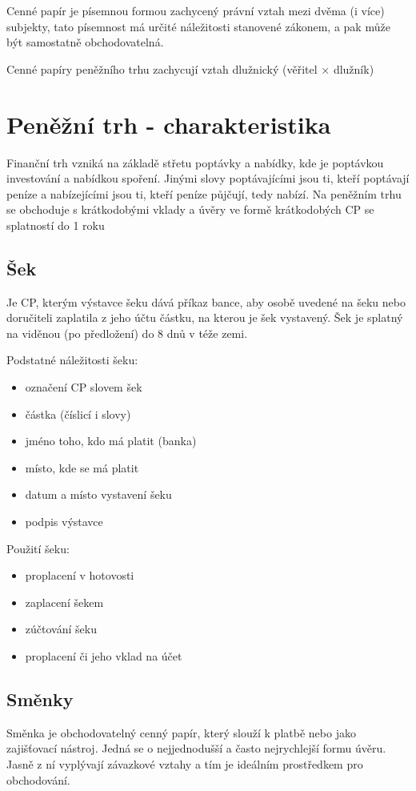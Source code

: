 Cenné papír je písemnou formou zachycený právní vztah mezi dvěma (i více) subjekty, tato písemnost má určité náležitosti stanovené zákonem, a pak může být samostatně obchodovatelná.

Cenné papíry peněžního trhu zachycují vztah dlužnický (věřitel $\times$ dlužník)

\section*{Peněžní trh - charakteristika}

Finanční trh vzniká na základě střetu poptávky a nabídky, kde je poptávkou investování a nabídkou spoření. Jinými slovy poptávajícími jsou ti, kteří poptávají peníze a nabízejícími jsou ti, kteří peníze půjčují, tedy nabízí. Na peněžním trhu se obchoduje s krátkodobými vklady a úvěry ve formě krátkodobých CP se splatností do 1 roku

\subsection*{Šek}

Je CP, kterým výstavce šeku dává příkaz bance, aby osobě uvedené na šeku nebo doručiteli zaplatila z jeho účtu částku,
na kterou je šek vystavený. Šek je splatný na viděnou (po předložení) do 8 dnů v téže zemi.

Podstatné náležitosti šeku:
\begin{itemize}
    \item označení CP slovem šek
    \item částka (číslicí i slovy)
    \item jméno toho, kdo má platit (banka)
    \item místo, kde se má platit
    \item datum a místo vystavení šeku
    \item podpis výstavce
\end{itemize}

Použití šeku:
\begin{itemize}
    \item proplacení v hotovosti
    \item zaplacení šekem
    \item zúčtování šeku
    \item proplacení či jeho vklad na účet
\end{itemize}

\subsection*{Směnky}
Směnka je obchodovatelný cenný papír, který slouží k platbě nebo jako zajišťovací nástroj. Jedná se o nejjednodušší a často nejrychlejší formu úvěru. Jasně z ní vyplývají závazkové vztahy a tím je ideálním prostředkem pro obchodování.

